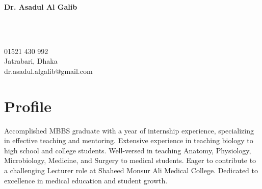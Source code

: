 \documentclass[a4paper,12pt]{article}
\begin{document}
\begin{minipage}[t][2cm]{\textwidth}
  \begin{minipage}[t]{0.63\textwidth}
    \raggedright
    {\Huge\bfseries\color{black}Dr. Asadul Al Galib}
  \end{minipage}
  \begin{minipage}[t]{0.04\textwidth}
      \faPhone\\
      \faMapMarker\\
      \faEnvelopeO
  \end{minipage}
  \begin{minipage}[t]{0.26\textwidth}
      01521 430 992\\
      Jatrabari, Dhaka\\
      dr.asadul.algalib@gmail.com
  \end{minipage}
\end{minipage}

\begin{minipage}[t][5.2cm]{0.98\textwidth}
  \section*{Profile}
  Accomplished MBBS graduate with a year of internship experience, specializing in effective teaching and mentoring. 
  Extensive experience in teaching biology to high school and college students. 
  Well-versed in teaching Anatomy, Physiology, Microbiology, Medicine, and Surgery to medical students. 
  Eager to contribute to a challenging Lecturer role at Shaheed Monsur Ali Medical College. 
  Dedicated to excellence in medical education and student growth.
\end{minipage}
\end{document}
